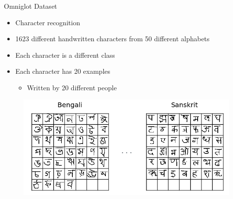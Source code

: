 \begin{frame}{Omniglot Dataset}

\begin{minipage}{0.7\textwidth}%
    \begin{itemize}
        \item Character recognition
        \item 1623 different handwritten characters from 50 different alphabets
        \item Each character is a different class
        \item Each character has 20 examples
        \begin{itemize}
            \item[\ding{43}] Written by 20 different people 
        \end{itemize}
    \end{itemize}
\begin{figure}
    \centering
    \includegraphics[scale=0.3]{images/Omniglot - Alphabets.png}
\end{figure}
\end{minipage}
\hfill
\begin{minipage}{0.2\textwidth}%
\begin{figure}
    \centering

\end{figure}
\end{minipage}
\end{frame}
